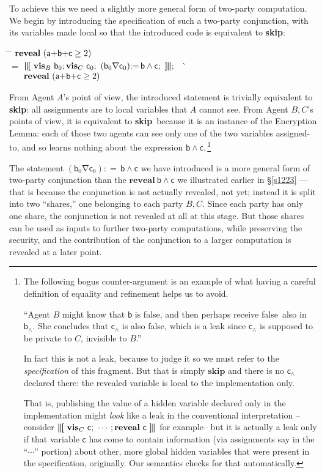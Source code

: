 \documentclass[runningheads]{llncs}
\makeatletter
\newcommand\Va {\mathsf{a}}
\newcommand\Vb {\mathsf{b}}
\newcommand\Vc {\mathsf{c}}
\newcommand\Sec[1] {Sec.~\ref{#1}}
\renewcommand\Sec[1] {\S\ref{#1}}
\newcommand\Gets {{:}{=}\,}
\newcommand\Reveal {\textbf{reveal}}
\newcommand\False {\textsf{false}}
\newcommand\Xor {\mathbin{\nabla}}
\newcommand\Vis {\textbf{vis}}
\newcommand{\Begin}{\mbox{\boldmath\textbf{$\parallel\kern-.365em[$}}}
\newcommand{\End}{\mbox{\boldmath\textbf{$]\kern-.365em\parallel$}}}
\newcommand\Skip {\textbf{skip}}
\newenvironment{Reason}{\vspace{-.0em}\begin{tabbing}\hspace{2em}\= \hspace{1cm} \= \kill}{\end{tabbing}\vspace{-1em}}
\newcommand\Step[2] {#1 \> $\begin{array}[t]{@{}llll}#2\end{array}$ \\}
\newcommand\StepR[3] {#1 \> $\begin{array}[t]{@{}llll}#3\end{array}$ \` {\RF \makebox[0pt][r]{\begin{tabular}[t]{r}``#2''\end{tabular}}} \\}
\newcommand\RF {\small}
\makeatother
\begin{document}
To achieve this we need a slightly more general form of two-party computation. We begin by introducing the specification of such a two-party conjunction, with its variables made local so that the introduced code is equivalent to \Skip:
\begin{Reason}
\Step{}{
 \Reveal~(\Va{+}\Vb{+}\Vc \geq 2)
}
\Space
\StepR{$=$}{Two-party conjunction}{
 \Begin~\Vis_{B}~\Vb_{0}; \Vis_{C}~\Vc_{0};~ (\Vb_{0}{\Xor}\Vc_{0})\Gets \Vb\land \Vc; ~\End; \\
 \Reveal~(\Va{+}\Vb{+}\Vc \geq 2)
}
\end{Reason}
From Agent $A$'s point of view, the introduced statement is trivially equivalent to \Skip: all assignments are to local variables that $A$ cannot see. From Agent $B,C$'s points of view, it is equivalent to \Skip\ because it is an instance of the Encryption Lemma: each of those two agents can see only one of the two variables assigned-to, and so learns nothing about the expression $\Vb\land \Vc$.\,\footnote{The following bogus counter-argument is an example of what having a careful definition of equality and refinement helps us to avoid.

``Agent $B$ might know that $\Vb$ is \False, and then perhaps receive \False\ also in $\Vb_{\land}$. She concludes that $\Vc_{\land}$ is also \False, which is a leak since $\Vc_{\land}$ is supposed to be private to $C$, invisible to $B$.''

In fact this is not a leak, because to judge it so we must refer to the \emph{specification} of this fragment. But that is simply $\Skip$ and there is no $\Vc_{\land}$ declared there: the revealed variable is local to the implementation only.

That is, publishing the value of a hidden variable declared only in the implementation might \emph{look} like a leak in the conventional interpretation --consider $\Begin~\Vis_{C}~\Vc;~ \cdots; \Reveal~\Vc~\End$ for example-- but it is actually a leak only if that variable $\Vc$ has come to contain information (via assignments say in the ``$\cdots$'' portion) about other, more global hidden variables that were present in the specification, originally. Our semantics checks for that automatically.}

The statement $(\Vb_{0}{\Xor}\Vc_{0})\Gets \Vb\land \Vc$ we have introduced is a more general form of two-party conjunction than the $\Reveal~\Vb\land \Vc$ we illustrated earlier in \Sec{s1223} --- that is because the conjunction is not actually revealed, not yet; instead it is split into two ``shares,'' one belonging to each party $B,C$. Since each party has only one share, the conjunction is not revealed at all at this stage. But those shares can be used as inputs to further two-party computations, while preserving the security, and the contribution of the conjunction to a larger computation is revealed at a later point.
\end{document}
